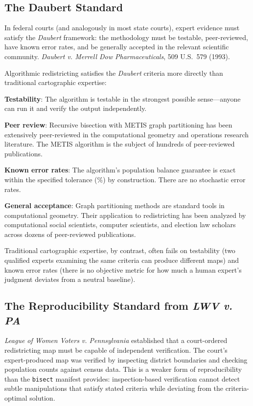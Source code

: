 \subsection{The Daubert Standard}

In federal courts (and analogously in most state courts), expert evidence must satisfy the \textit{Daubert} framework: the methodology must be testable, peer-reviewed, have known error rates, and be generally accepted in the relevant scientific community. \textit{Daubert v. Merrell Dow Pharmaceuticals}, 509 U.S.\ 579 (1993).

Algorithmic redistricting satisfies the \textit{Daubert} criteria more directly than traditional cartographic expertise:

\textbf{Testability}: The algorithm is testable in the strongest possible sense---anyone can run it and verify the output independently.

\textbf{Peer review}: Recursive bisection with METIS graph partitioning has been extensively peer-reviewed in the computational geometry and operations research literature. The METIS algorithm is the subject of hundreds of peer-reviewed publications.

\textbf{Known error rates}: The algorithm's population balance guarantee is exact within the specified tolerance (\%) by construction. There are no stochastic error rates.

\textbf{General acceptance}: Graph partitioning methods are standard tools in computational geometry. Their application to redistricting has been analyzed by computational social scientists, computer scientists, and election law scholars across dozens of peer-reviewed publications.

Traditional cartographic expertise, by contrast, often fails on testability (two qualified experts examining the same criteria can produce different maps) and known error rates (there is no objective metric for how much a human expert's judgment deviates from a neutral baseline).

\subsection{The Reproducibility Standard from \textit{LWV v. PA}}

\textit{League of Women Voters v. Pennsylvania} established that a court-ordered redistricting map must be capable of independent verification. The court's expert-produced map was verified by inspecting district boundaries and checking population counts against census data. This is a weaker form of reproducibility than the \texttt{bisect} manifest provides: inspection-based verification cannot detect subtle manipulations that satisfy stated criteria while deviating from the criteria-optimal solution.

